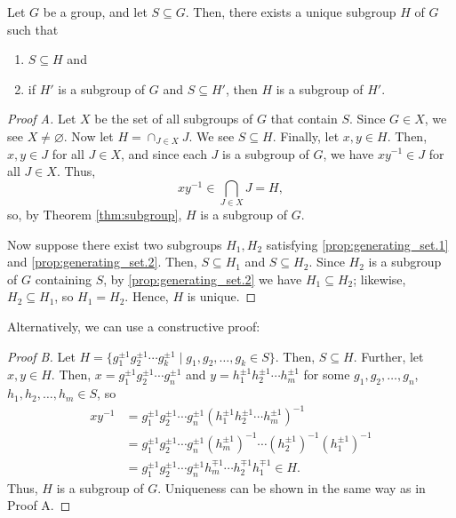 \begin{prop}\label{prop:generating_set}
Let $ G $ be a group, and let $ S\subseteq G $. Then, there exists a unique subgroup $ H $ of $ G $ such that
\begin{enumerate}
    \item $ S\subseteq H $ and \label{prop:generating_set.1}
    \item if $ H' $ is a subgroup of $ G $ and $ S\subseteq H' $, then $ H $ is a subgroup of $ H' $. \label{prop:generating_set.2}
\end{enumerate}
\end{prop}
\begin{proof}[Proof A]
Let $ X $ be the set of all subgroups of $ G $ that contain $ S $. Since $ G\in X $, we see $ X\neq\varnothing $. Now let $ H=\cap_{J\in X}J $. We see $ S\subseteq H $. Finally, let $ x,y\in H $. Then, $ x,y\in J $ for all $ J\in X $, and since each $ J $ is a subgroup of $ G $, we have $ xy^{-1}\in J $ for all $ J\in X $. Thus,
\begin{equation*}
    xy^{-1}\in\bigcap_{J\in X}J=H,
\end{equation*}
so, by Theorem \ref{thm:subgroup}, $ H $ is a subgroup of $ G $.

Now suppose there exist two subgroups $ H_1,H_2 $ satisfying \ref{prop:generating_set.1} and \ref{prop:generating_set.2}. Then, $ S\subseteq H_1 $ and $ S\subseteq H_2 $. Since $ H_2 $ is a subgroup of $ G $ containing $ S $, by \ref{prop:generating_set.2} we have $ H_1\subseteq H_2 $; likewise, $ H_2\subseteq H_1 $, so $ H_1=H_2 $. Hence, $ H $ is unique.
\end{proof}
Alternatively, we can use a constructive proof:
\begin{proof}[Proof B]
Let $ H=\{g_1^{\pm 1}g_2^{\pm 1}\cdots g_k^{\pm 1}\mid g_1,g_2,\ldots,g_k\in S\} $. Then, $ S\subseteq H $. Further, let $ x,y\in H $. Then, $ x=g_1^{\pm 1}g_2^{\pm 1}\cdots g_n^{\pm 1} $ and $ y=h_1^{\pm 1}h_2^{\pm 1}\cdots h_m^{\pm 1} $ for some $ g_1,g_2,\ldots,g_n $, $ h_1,h_2,\ldots,h_m\in S $, so
\begin{align*}
    xy^{-1} &= g_1^{\pm 1}g_2^{\pm 1}\cdots g_n^{\pm 1}(h_1^{\pm 1}h_2^{\pm 1}\cdots h_m^{\pm 1})^{-1} \\
    &= g_1^{\pm 1}g_2^{\pm 1}\cdots g_n^{\pm 1}(h_m^{\pm 1})^{-1}\cdots(h_2^{\pm 1})^{-1}(h_1^{\pm 1})^{-1} \\
    &= g_1^{\pm 1}g_2^{\pm 1}\cdots g_n^{\pm 1}h_m^{\mp 1}\cdots h_2^{\mp 1}h_1^{\mp 1}\in H.
\end{align*}
Thus, $ H $ is a subgroup of $ G $. Uniqueness can be shown in the same way as in Proof A.
\end{proof}

